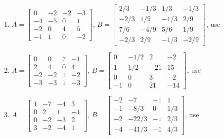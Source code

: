 \begin{exercise}
\begin{enumerate}
\item \(A=\begin{bmatrix} 0&-2&-2&-3
\\-4&-5&0&1
\\-2&0&4&5
\\-1&1&0&-2 \end{bmatrix}\), 
\setbox\ajrqrbox\hbox{}%
\marginpar{\usebox{\ajrqrbox}}%
\(B=\begin{bmatrix} 2/3&-1/3&1/3&-1/3
\\-2/3&1/9&-1/3&2/9
\\7/6&-4/9&5/6&1/9
\\-2/3&2/9&-1/3&-2/9 \end{bmatrix}\), use \script
{}

\item \(A=\begin{bmatrix} 0&0&7&-1
\\2&4&0&4
\\-2&-2&1&-2
\\-3&-3&1&-3 \end{bmatrix}\), 
\setbox\ajrqrbox\hbox{}%
\marginpar{\usebox{\ajrqrbox}}%
\(B=\begin{bmatrix} 0&-1/2&2&-2
\\1&1/2&-21&15
\\0&0&3&-2
\\-1&0&21&-14 \end{bmatrix}\), use \script
{}

\item \(A=\begin{bmatrix} 1&-7&-4&3
\\0&2&1&-1
\\0&-2&-3&2
\\3&-2&-4&1 \end{bmatrix}\), 
\setbox\ajrqrbox\hbox{}%
\marginpar{\usebox{\ajrqrbox}}%
\(B=\begin{bmatrix} -2&-7&-1&1
\\-1&-8/3&0&1/3
\\-2&-22/3&-1&2/3
\\-4&-41/3&-1&4/3 \end{bmatrix}\), use \script
{}

\end{enumerate}
\end{exercise}




